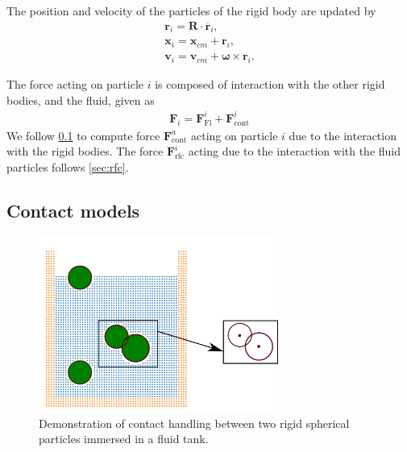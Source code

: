 \documentclass[preprint,12pt]{elsarticle}
\newcommand{\teng}[1]{\ensuremath{\boldsymbol{#1}}}
\newcommand{\ten}[1]{\ensuremath{\mathbf{#1}}}
\begin{document}
The position and velocity of the particles of the rigid body are updated by
\begin{eqnarray}
  \label{eq:rfc:rb_particle_pos_update}
  \ten{r}_i = \ten{R} \cdot \overline{\ten{r}}_{i},\\
  \ten{x}_i = \ten{x}_{cm} + \ten{r}_{i},\\
  \ten{v}_i = \ten{v}_{cm} + \teng{\omega} \times \ten{r}_{i}.
\end{eqnarray}

The force acting on particle $i$ is composed of interaction with the other rigid
bodies, and the fluid, given as
\begin{eqnarray}
  \label{eq:rfc:rb_particle_pos_update}
  \ten{F}_i = \ten{F}_{\text{Fl}}^i + \ten{F}_{\text{cont}}^i
\end{eqnarray}
We follow \cref{sec:dem} to compute force
$\ten{F}_{\text{cont}}^a$ acting on particle $i$ due to the interaction with
the rigid bodies. The force $\ten{F}_{\text{rfc}}^i$ acting due to the
interaction with the fluid particles follows \cref{sec:rfc}.



\FloatBarrier%
\subsection{Contact models}
\label{sec:dem}

\begin{figure}[!htpb]
  \centering
  \includegraphics[width=0.7\textwidth]{images/spherical_particles_dem_representation}
  \caption{Demonstration of contact handling between two rigid spherical
    particles immersed in a fluid tank.}
  \label{fig:spherical-particles-in-tank-dem}
\end{figure}
\end{document}
